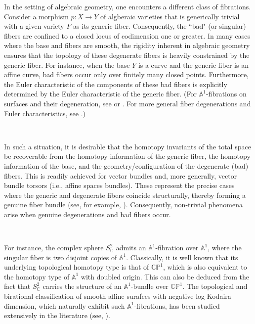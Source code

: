 \documentclass[11pt, reqno]{amsart}
\theoremstyle{plain}
\theoremstyle{definition}
\begin{document}
In the setting of algebraic geometry, one encounters a different class of fibrations. Consider a morphism $p : X \to Y$ of algberaic varieties that is generically trivial with a given variety $F$ as its generic fiber. Consequently, the ``bad" (or singular) fibers are confined to a closed locus of codimension one or greater. In many cases where the base and fibers are smooth, the rigidity inherent in algebraic geometry ensures that the topology of these degenerate fibers is heavily constrained by the generic fiber. For instance, when the base $Y$ is a curve and the generic fiber is an affine curve, bad fibers occur only over finitely many closed points. Furthermore, the Euler characteristic of the components of these bad fibers is explicitly determined by the Euler characteristic of the generic fiber. (For $\mathbb{A}^1$-fibrations on surfaces and their degeneration, see \cite{miyanishicrm} or  \cite{kambayashi}. For more general fiber degenerations and Euler characteristics, see \cite{iitaka}.)



\ 

In such a situation, it is desirable that the homotopy invariants of the total space be recoverable from the homotopy information of the generic fiber, the homotopy information of the base, and the geometry/configuration of the degenerate (bad) fibers. This is readily achieved for vector bundles and, more generally, vector bundle torsors (i.e., affine spaces bundles). These represent the precise cases where the generic and degenerate fibers coincide structurally, thereby forming a genuine fiber bundle (see, for example, \cite{brauer group}). Consequently, non-trivial phenomena arise when genuine degenerations and bad fibers occur. 




\

For instance, the complex sphere $S^2_{\mathbb{C}}$ admits an $\mathbb{A}^1$-fibration over $\mathbb{A}^1$, where the singular fiber is two disjoint copies of $\mathbb{A}^1$. Classically, it is well known that its underlying topological homotopy type is that of $\mathbb{CP}^1$,  which is also equivalent to the homotopy type of $\mathbb{A}^1$ with doubled origin. This can also be deduced from the fact that $S^2_{\mathbb{C}}$ carries the structure of an $\mathbb{A}^1$-bundle over $\mathbb{CP}^1$. The topological and birational classification of smooth affine surafces with negative log Kodaira dimension, which naturally exhibit such $\mathbb{A}^1$-fibrations, has been studied extensively in the literature (see, \cite{miyanishicrm}).
\end{document}
